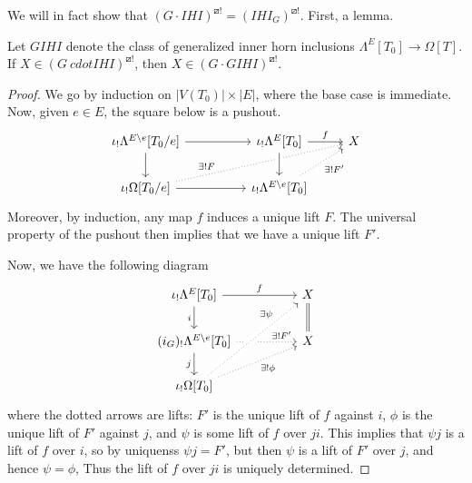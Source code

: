 \documentclass[a4paper,10pt,draft]{article}%
\begin{document}
We will in fact show that $(G \cdot IHI)^{\boxslash !} = (IHI_G)^{\boxslash !}$.
First, a lemma.

\begin{lemma}
      Let $GIHI$ denote the class of generalized inner horn inclusions $\Lambda^E[T_0] \to \Omega[T]$. 
      If $X \in (G\ cdot IHI)^{\boxslash !}$, then
      $X \in (G \cdot GIHI)^{\boxslash !}$. 
\end{lemma}
\begin{proof}
      We go by induction on $|V(T_0)| \times |E|$, where the base case is immediate.
      Now, given $e\in E$, the square below is a pushout.
      \begin{equation}
            \begin{tikzcd}
                  \iota_!\Lambda^{E\setminus e}[T_0/e] \arrow[rr] \arrow[d]
                  &&
                  \iota_!\Lambda^E[T_0] \arrow[r, "f"]
                  &
                  X
                  \\
                  \iota_!\Omega[T_0/e] \arrow[rr] \arrow[urrr, dotted, near start, "\exists! F"]
                  &&
                  \iota_!\Lambda^{E\setminus e}[T_0] \arrow[ur, dotted, "\exists! F'"'] \arrow[u, leftarrow, crossing over]
            \end{tikzcd}
      \end{equation}
      Moreover, by induction, any map $f$ induces a unique lift $F$.
      The universal property of the pushout then implies that we have a unique lift $F'$.

      Now, we have the following diagram
      \begin{equation}
            \begin{tikzcd}
                  \iota_!\Lambda^{E}[T_0] \arrow[rr, "f"] \arrow[d, "i"']
                  &&
                  X \arrow[d, equal]
                  \\
                  |[alias = U]| (i_G)_!\Lambda^{E \setminus e}[T_0] \arrow[d, "j"'] \arrow[rr, dotted, near end, "\exists! F'"]
                  &&
                  |[alias=V]| X
                  \\
                  \iota_!\Omega[T_0]
                  \arrow[uurr, dotted, near end, crossing over, "\exists \psi"] \arrow[urr, dotted, "\exists! \phi"']
            \end{tikzcd}
      \end{equation}
      where the dotted arrows are lifts:
      $F'$ is the unique lift of $f$ against $i$,
      $\phi$ is the unique lift of $F'$ against $j$, and
      $\psi$ is some lift of $f$ over $ji$.
      This implies that $\psi j$ is a lift of $f$ over $i$, so by uniquenss $\psi j = F'$, but then
      $\psi$ is a lift of $F'$ over $j$, and hence $\psi = \phi$,
      Thus the lift of $f$ over $j i$ is uniquely determined.
\end{proof}
\end{document}
